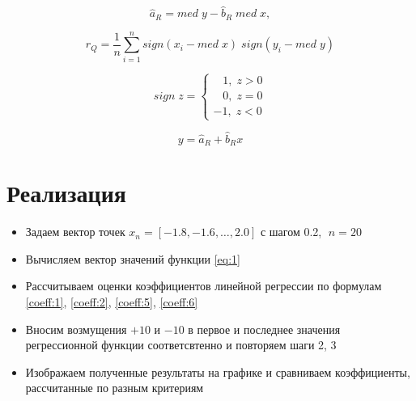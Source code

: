 \documentclass[12pt]{article}
\begin{document}
\begin{equation}
    \label{coeff:6}
    \hat a_R = med \; y - \hat b_R \; med \; x,
\end{equation}

\begin{equation}
    \label{coeff:7}
    r_Q = \frac{1}{n} \sum_{i=1}^{n}{sign(x_i - med \; x) \; sign(y_i - med \; y)}
\end{equation}

\begin{equation}
    \label{eq:3}
    sign \; z = 
    \begin{cases}
    \;\;\;1, \; z > 0 \\
    \;\;\;0, \; z = 0 \\
    -1, \;z < 0
    \end{cases}
\end{equation}


\begin{equation}
    \label{eq:4}
    y = \hat a_R + \hat b_R x
\end{equation}

\section*{Реализация}
\begin{itemize}
    \item Задаем вектор точек $x_n = [-1.8, -1.6, \ldots, 2.0]$ с шагом 0.2, $ \; n = 20$ 
    \item Вычисляем вектор значений функции \eqref{eq:1}
    \item Рассчитываем оценки коэффициентов линейной регрессии по формулам \eqref{coeff:1}, \eqref{coeff:2}, \eqref{coeff:5}, \eqref{coeff:6} 
    \item Вносим возмущения $+10$ и $-10$ в первое и последнее значения регрессионной функции соответсвтенно и повторяем шаги 2, 3
    \item Изображаем полученные результаты на графике и сравниваем коэффициенты, рассчитанные по разным критериям 
\end{itemize}
\end{document}
